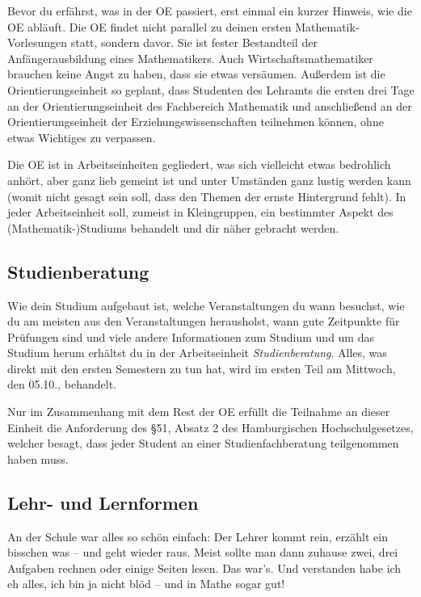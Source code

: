 Bevor du erfährst, was in der OE passiert, erst einmal ein kurzer Hinweis, wie
die OE abläuft. Die OE findet nicht parallel zu deinen ersten
Mathematik-Vorlesungen statt, sondern davor. Sie ist fester Bestandteil der
Anfängerausbildung eines Mathematikers.  Auch Wirtschaftsmathematiker brauchen
keine Angst zu haben, dass sie etwas versäumen. Außerdem ist die
Orientierungseinheit so geplant, dass Studenten des Lehramts die ersten drei
Tage an der Orientierungseinheit des Fachbereich Mathematik und anschließend an
der Orientierungseinheit der Erziehungswissenschaften teilnehmen können, ohne
etwas Wichtiges zu verpassen.

Die OE ist in Arbeitseinheiten gegliedert, was sich vielleicht etwas bedrohlich
anhört, aber ganz lieb gemeint ist und unter Umständen ganz lustig werden kann
(womit nicht gesagt sein soll, dass den Themen der ernste Hintergrund fehlt).
In jeder Arbeitseinheit soll, zumeist in Kleingruppen, ein bestimmter Aspekt
des (Mathematik-)Studiums behandelt und dir näher gebracht werden.

\subsection*{Studienberatung}


Wie dein Studium aufgebaut ist, welche Veranstaltungen du wann besuchst, wie du
am meisten aus den Veranstaltungen herausholst, wann gute Zeitpunkte für
Prüfungen sind und viele andere Informationen zum Studium und um das Studium
herum erhältst du in der Arbeitseinheit \emph{Studienberatung}. Alles, was
direkt mit den ersten Semestern zu tun hat, wird im ersten Teil am Mittwoch,
den 05.10., behandelt.

Nur im Zusammenhang mit dem Rest der OE erfüllt die Teilnahme an dieser Einheit
die Anforderung des \S 51, Absatz 2 des Hamburgischen Hochschulgesetzes,
welcher besagt, dass jeder Student an einer Studienfachberatung teilgenommen
haben muss.

\subsection*{Lehr- und Lernformen}

An der Schule war alles so schön einfach: Der Lehrer kommt rein, erzählt ein
bisschen was -- und geht wieder raus. Meist sollte man dann zuhause zwei, drei
Aufgaben rechnen oder einige Seiten lesen. Das war's. Und verstanden habe ich
eh alles, ich bin ja nicht blöd -- und in Mathe sogar gut!

